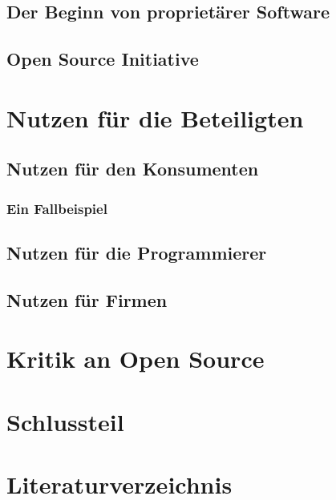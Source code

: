 \documentclass[a4paper,12pt]{article}
\begin{document}
\subsection{Der Beginn von proprietärer Software}
\subsection{Open Source Initiative}
\section{Nutzen für die Beteiligten}
\subsection{Nutzen für den Konsumenten}
\subsubsection{Ein Fallbeispiel}
\subsection{Nutzen für die Programmierer}
\subsection{Nutzen für Firmen}
\section{Kritik an Open Source}
\section{Schlussteil}
\section{Literaturverzeichnis}
\end{document}
